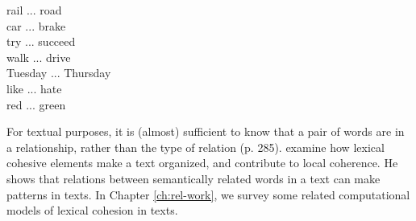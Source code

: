 \begin{examples}
	\label{ex:coh-word-pairs}
	rail ... road \\
	car ... brake \\
	try ... succeed \\
	walk ... drive \\
	Tuesday ... Thursday \\
	like ... hate \\
	red ... green 
\end{examples}

For textual purposes, it is (almost) sufficient to know that a pair of words are in a relationship, rather than the type of relation \cite{halliday76} (p. 285).  
 examine how lexical cohesive elements make a text organized, and contribute to local coherence. 
He shows that relations between semantically related words in a text can make patterns in texts. 
In Chapter \ref{ch:rel-work}, we survey some related computational models of lexical cohesion in texts. 



